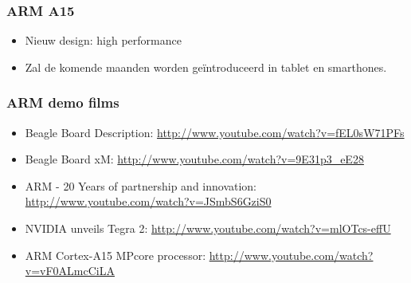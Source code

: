 \documentclass{beamer}
\begin{document}
\begin{frame} 
\frametitle{ARM A15}

\begin{itemize}
 \item Nieuw design: high performance
 \item Zal de komende maanden worden ge\"introduceerd in tablet en smarthones.
\end{itemize}

\end{frame}



\begin{frame} 
\frametitle{ARM demo films}
  \begin{itemize}
  \item <1-> Beagle Board Description: \url{http://www.youtube.com/watch?v=fEL0sW71PFs}
  \item <2-> Beagle Board xM: \url{http://www.youtube.com/watch?v=9E31p3_eE28}
  \item <3-> ARM - 20 Years of partnership and innovation: \url{http://www.youtube.com/watch?v=JSmbS6GziS0}
  \item <4-> NVIDIA unveils Tegra 2: \url{http://www.youtube.com/watch?v=mlOTcs-effU}
  \item <5-> ARM Cortex-A15 MPcore processor: \url{http://www.youtube.com/watch?v=vF0ALmcCiLA}
  \end{itemize} 
\end{frame}
\end{document}
